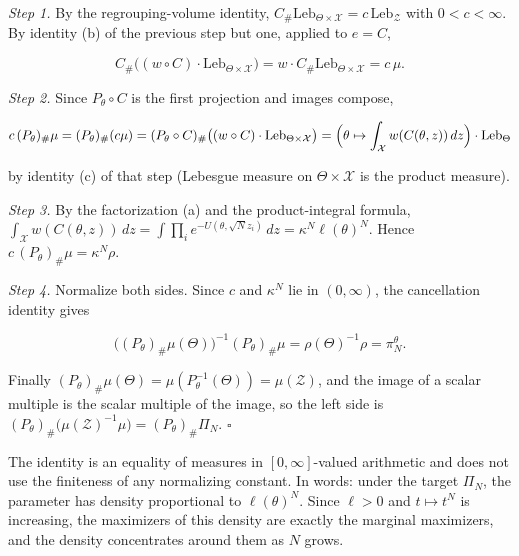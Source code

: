\documentclass[11pt,a4paper]{report}
\begin{document}
\emph{Step 1.} By the regrouping-volume identity, \(C_\#\mathrm{Leb}_{\Theta\times\mathcal X}=c\,\mathrm{Leb}_{\mathcal Z}\) with \(0<c<\infty\). By identity (b) of the previous step but one, applied to \(e=C\),


\[C_\#\bigl((w\circ C)\cdot\mathrm{Leb}_{\Theta\times\mathcal X}\bigr)=w\cdot C_\#\mathrm{Leb}_{\Theta\times\mathcal X}=c\,\mu .\]


\emph{Step 2.} Since \(P_\theta\circ C\) is the first projection and images compose,


\[c\,(P_\theta)_\#\mu=(P_\theta)_\#(c\mu)=(P_\theta\circ C)_\#\bigl((w\circ C)\cdot\mathrm{Leb}_{\Theta\times\mathcal X}\bigr)=\Bigl(\theta\mapsto\int_{\mathcal X}w(C(\theta,z))\,dz\Bigr)\cdot\mathrm{Leb}_\Theta\]


by identity (c) of that step (Lebesgue measure on \(\Theta\times\mathcal X\) is the product measure).




\emph{Step 3.} By the factorization (a) and the product-integral formula, \(\int_{\mathcal X}w(C(\theta,z))\,dz=\int\prod_ie^{-U(\theta,\sqrt Nz_i)}\,dz=\kappa^N\ell(\theta)^N\). Hence \(c\,(P_\theta)_\#\mu=\kappa^N\rho\).




\emph{Step 4.} Normalize both sides. Since \(c\) and \(\kappa^N\) lie in \((0,\infty)\), the cancellation identity gives


\[\bigl((P_\theta)_\#\mu(\Theta)\bigr)^{-1}(P_\theta)_\#\mu=\rho(\Theta)^{-1}\rho=\pi_N^\theta .\]


Finally \((P_\theta)_\#\mu(\Theta)=\mu(P_\theta^{-1}(\Theta))=\mu(\mathcal Z)\), and the image of a scalar multiple is the scalar multiple of the image, so the left side is \((P_\theta)_\#\bigl(\mu(\mathcal Z)^{-1}\mu\bigr)=(P_\theta)_\#\Pi_N\). \(\square\)




The identity is an equality of measures in \([0,\infty]\)-valued arithmetic and does not use the finiteness of any normalizing constant. In words: under the target \(\Pi_N\), the parameter has density proportional to \(\ell(\theta)^N\). Since \(\ell>0\) and \(t\mapsto t^N\) is increasing, the maximizers of this density are exactly the marginal maximizers, and the density concentrates around them as \(N\) grows.
\end{document}
